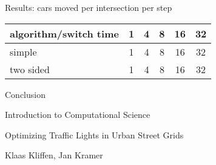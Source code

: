 \documentclass[11pt]{beamer}
\begin{document}
\begin{frame}{Results: cars moved per intersection per step}
\begin{table}
\centering
\begin{tabular}{l|c|c|c|c|c}
algorithm/switch time & 1 & 4 & 8 & 16 & 32\\
\hline
simple & 1 & 4 & 8 & 16 & 32\\
two sided & 1 & 4 & 8 & 16 & 32\\
\end{tabular}
\end{table}
 
\end{frame}


\begin{frame}{Conclusion}
    
\end{frame}

\begin{frame}{Introduction to Computational Science}
\begin{center}
{\large Optimizing Traffic Lights in Urban Street Grids}\\
\end{center}

\begin{center}
Klaas Kliffen, Jan Kramer
\end{center}

    
\end{frame}
\end{document}
